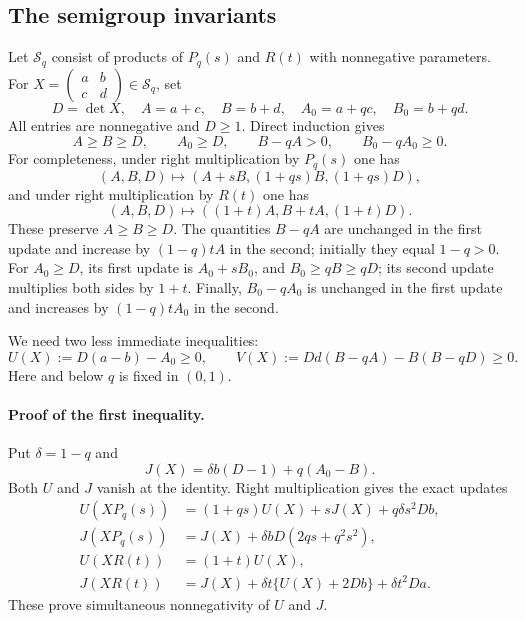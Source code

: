 \documentclass[11pt,a4paper]{article}
\theoremstyle{definition}
\theoremstyle{remark}\newtheorem{remark}[theorem]{Remark}
\begin{document}
\subsection{The semigroup invariants}
Let $\mathcal S_q$ consist of products of $P_q(s)$ and $R(t)$ with nonnegative parameters. For
$X=\left(\begin{smallmatrix}a&b\\c&d\end{smallmatrix}\right)\in\mathcal S_q$, set
\[
 D=\det X,\quad A=a+c,\quad B=b+d,\quad A_0=a+qc,\quad B_0=b+qd.
\]
All entries are nonnegative and $D\ge1$. Direct induction gives
\begin{equation}\label{wheel:basic}
 A\ge B\ge D,\qquad A_0\ge D,\qquad B-qA>0,\qquad B_0-qA_0\ge0.
\end{equation}
For completeness, under right multiplication by $P_q(s)$ one has
\[
 (A,B,D)\mapsto(A+sB,(1+qs)B,(1+qs)D),
\]
and under right multiplication by $R(t)$ one has
\[
 (A,B,D)\mapsto((1+t)A,B+tA,(1+t)D).
\]
These preserve $A\ge B\ge D$. The quantities $B-qA$ are unchanged in the first update and increase by $(1-q)tA$ in the second; initially they equal $1-q>0$. For $A_0\ge D$, its first update is $A_0+sB_0$, and $B_0\ge qB\ge qD$; its second update multiplies both sides by $1+t$. Finally, $B_0-qA_0$ is unchanged in the first update and increases by $(1-q)tA_0$ in the second.

We need two less immediate inequalities:
\begin{equation}\label{wheel:UV}
 U(X):=D(a-b)-A_0\ge0,
 \qquad V(X):=Dd(B-qA)-B(B-qD)\ge0.
\end{equation}
Here and below $q$ is fixed in $(0,1)$.

\paragraph{Proof of the first inequality.}
Put $\delta=1-q$ and
\[
 J(X)=\delta b(D-1)+q(A_0-B).
\]
Both $U$ and $J$ vanish at the identity. Right multiplication gives the exact updates
\begin{align*}
 U(XP_q(s))&=(1+qs)U(X)+sJ(X)+q\delta s^2Db,\\
 J(XP_q(s))&=J(X)+\delta bD(2qs+q^2s^2),\\
 U(XR(t))&=(1+t)U(X),\\
 J(XR(t))&=J(X)+\delta t\{U(X)+2Db\}+\delta t^2Da.
\end{align*}
These prove simultaneous nonnegativity of $U$ and $J$.
\end{document}
